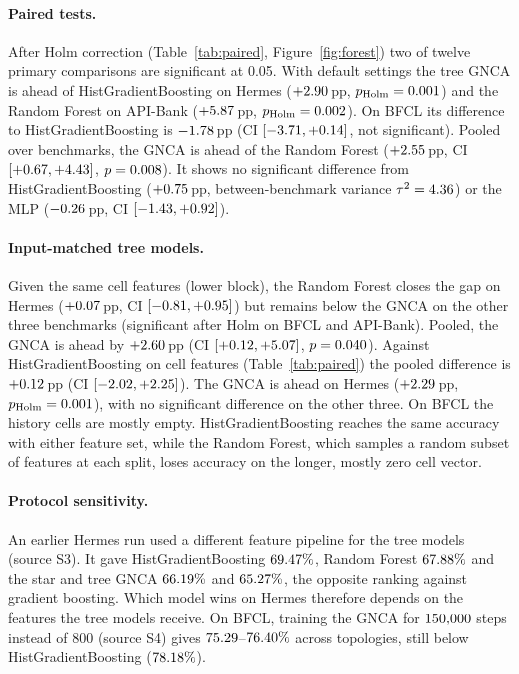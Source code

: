\documentclass[10pt,twocolumn,letterpaper]{article}
\begin{document}
\paragraph{Paired tests.} After Holm correction (Table~\ref{tab:paired}, Figure~\ref{fig:forest}) two of twelve primary comparisons are significant at 0.05. With default settings the tree GNCA is ahead of HistGradientBoosting on Hermes ($+2.90$\,pp, $p_{\text{Holm}}=0.001$) and the Random Forest on API-Bank ($+5.87$\,pp, $p_{\text{Holm}}=0.002$). On BFCL its difference to HistGradientBoosting is $-1.78$\,pp (CI $[-3.71, +0.14]$, not significant). Pooled over benchmarks, the GNCA is ahead of the Random Forest ($+2.55$\,pp, CI $[+0.67, +4.43]$, $p=0.008$). It shows no significant difference from HistGradientBoosting ($+0.75$\,pp, between-benchmark variance $\tau^2=4.36$) or the MLP ($-0.26$\,pp, CI $[-1.43, +0.92]$).
\paragraph{Input-matched tree models.} Given the same cell features (lower block), the Random Forest closes the gap on Hermes ($+0.07$\,pp, CI $[-0.81, +0.95]$) but remains below the GNCA on the other three benchmarks (significant after Holm on BFCL and API-Bank). Pooled, the GNCA is ahead by $+2.60$\,pp (CI $[+0.12, +5.07]$, $p=0.040$). Against HistGradientBoosting on cell features (Table~\ref{tab:paired}) the pooled difference is $+0.12$\,pp (CI $[-2.02, +2.25]$). The GNCA is ahead on Hermes ($+2.29$\,pp, $p_{\text{Holm}}=0.001$), with no significant difference on the other three. On BFCL the history cells are mostly empty. HistGradientBoosting reaches the same accuracy with either feature set, while the Random Forest, which samples a random subset of features at each split, loses accuracy on the longer, mostly zero cell vector.
\paragraph{Protocol sensitivity.} An earlier Hermes run used a different feature pipeline for the tree models (source S3). It gave HistGradientBoosting $69.47\%$, Random Forest $67.88\%$ and the star and tree GNCA $66.19\%$ and $65.27\%$, the opposite ranking against gradient boosting. Which model wins on Hermes therefore depends on the features the tree models receive. On BFCL, training the GNCA for $150{,}000$ steps instead of 800 (source S4) gives $75.29$--$76.40\%$ across topologies, still below HistGradientBoosting ($78.18\%$).
\end{document}
